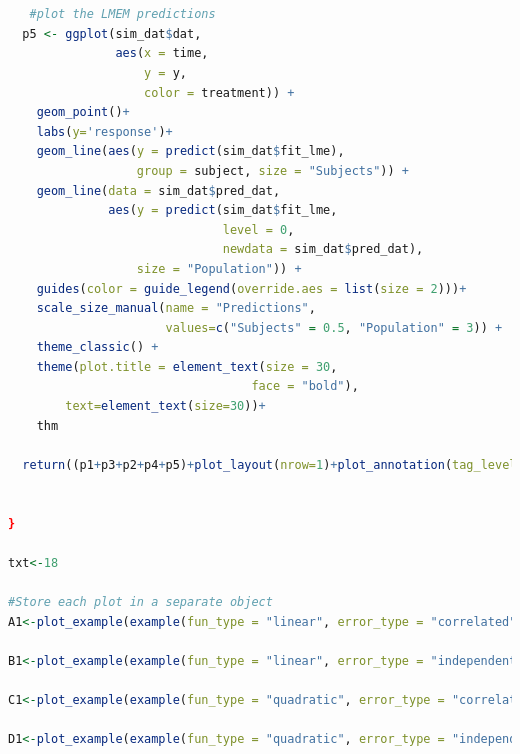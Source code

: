 \documentclass[
]{article}
\begin{document}
\begin{lstlisting}[language=R]
   
   
   #plot the LMEM predictions
  p5 <- ggplot(sim_dat$dat, 
               aes(x = time, 
                   y = y, 
                   color = treatment)) +
    geom_point()+
    labs(y='response')+
    geom_line(aes(y = predict(sim_dat$fit_lme), 
                  group = subject, size = "Subjects")) +
    geom_line(data = sim_dat$pred_dat, 
              aes(y = predict(sim_dat$fit_lme, 
                              level = 0, 
                              newdata = sim_dat$pred_dat), 
                  size = "Population")) +
    guides(color = guide_legend(override.aes = list(size = 2)))+
    scale_size_manual(name = "Predictions", 
                      values=c("Subjects" = 0.5, "Population" = 3)) +
    theme_classic() +
    theme(plot.title = element_text(size = 30, 
                                  face = "bold"),
        text=element_text(size=30))+
    thm
  
  return((p1+p3+p2+p4+p5)+plot_layout(nrow=1)+plot_annotation(tag_levels = 'A')) 
  
    
}

txt<-18

#Store each plot in a separate object
A1<-plot_example(example(fun_type = "linear", error_type = "correlated")) 

B1<-plot_example(example(fun_type = "linear", error_type = "independent")) 
  
C1<-plot_example(example(fun_type = "quadratic", error_type = "correlated")) 
  
D1<-plot_example(example(fun_type = "quadratic", error_type = "independent")) 
\end{lstlisting}
\end{document}
